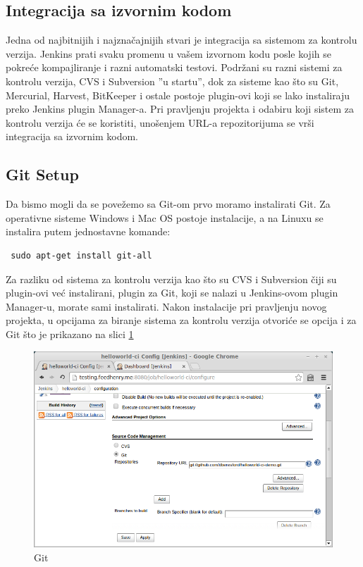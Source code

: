 \subsection{Integracija sa izvornim kodom}

Jedna od najbitnijih i najznačajnijih stvari je integracija sa sistemom za kontrolu verzija. Jenkins prati svaku promenu u vašem izvornom kodu posle kojih se pokreće kompajliranje i razni automatski testovi. Podržani su razni sistemi za kontrolu verzija, CVS i Subversion ''u startu'', dok za sisteme kao što su Git, Mercurial, Harvest, BitKeeper i ostale postoje plugin-ovi koji se lako instaliraju preko Jenkins plugin Manager-a. Pri pravljenju projekta i odabiru koji sistem za kontrolu verzija će se koristiti, unošenjem URL-a repozitorijuma se vrši integracija sa izvornim kodom.

\subsection{Git Setup}

Da bismo mogli da se povežemo sa Git-om prvo moramo instalirati Git. Za operativne sisteme Windows i Mac OS postoje instalacije, a na Linuxu se instalira putem jednostavne komande:

\begin{verbatim}
 sudo apt-get install git-all
\end{verbatim}

Za razliku od sistema za kontrolu verzija kao što su CVS i Subversion čiji su plugin-ovi već instalirani, plugin za Git, koji se nalazi u Jenkins-ovom plugin Manager-u, morate sami instalirati. Nakon instalacije pri pravljenju novog projekta, u opcijama za biranje sistema za kontrolu verzija otvoriće se opcija i za Git što je prikazano na slici \ref{fig:git}

\begin{figure}[h!]
\begin{center}
\includegraphics[scale=0.75, totalheight=0.4\textheight]{slike/git_jenkins.png}
\end{center}
\caption{Git}
\label{fig:git}
\end{figure}

